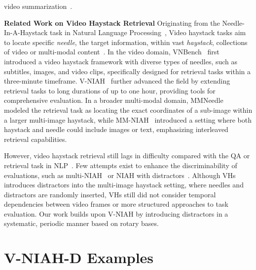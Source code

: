 video summarization~\cite{chai2024auroracapefficientperformantvideo}.

\noindent \textbf{Related Work on Video Haystack Retrieval}
Originating from the Needle-In-A-Haystack task in Natural Language Processing~\citep{niah,multi_niah}, Video haystack tasks aim to locate specific \textit{needle}, the target information, within vast \textit{haystack}, collections of video or multi-modal content~\cite{zhang2024longva,wang2024needle}. In the video domain, VNBench~\cite{zhao2024videoniah} first introduced a video haystack framework with diverse types of needles, such as subtitles, images, and video clips, specifically designed for retrieval tasks within a three-minute timeframe. V-NIAH~\cite{zhang2024longva} further advanced the field by extending retrieval tasks to long durations of up to one hour, providing tools for comprehensive evaluation. In a broader multi-modal domain, MMNeedle~\cite{wang2024multimodal} modeled the retrieval task as locating the exact coordinates of a sub-image within a larger multi-image haystack, while MM-NIAH~\cite{wang2024needle}  introduced a setting where both haystack and needle could include images or text, emphasizing interleaved retrieval capabilities.


However, video haystack retrieval still lags in difficulty compared with the QA or retrieval task in NLP~\citep{hsieh2024ruler,yuan2024lv}. Few attempts exist to enhance the discriminability of evaluations, such as multi-NIAH~\citep{multi_niah,hsieh2024ruler} or NIAH with distractors~\citep{hsieh2024ruler}. Although VHs~\cite{wu2024visual} introduces distractors into the multi-image haystack setting, where needles and distractors are randomly inserted, VHs still did not consider temporal dependencies between video frames or more structured approaches to task evaluation. Our work builds upon V-NIAH by introducing distractors in a systematic, periodic manner based on rotary bases. 



\section{V-NIAH-D Examples}\label{app:video_niah_d}

